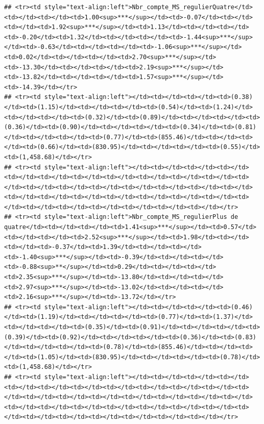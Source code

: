 \documentclass[
]{article}
\begin{document}
\begin{verbatim}
## <tr><td style="text-align:left">Nbr_compte_MS_regulierQuatre</td><td></td><td></td><td>1.00<sup>***</sup></td><td>-0.07</td><td></td><td></td><td>1.92<sup>***</sup></td><td>1.13</td><td></td><td></td><td>-0.20</td><td>1.32</td><td></td><td></td><td>-1.44<sup>***</sup></td><td>-0.63</td><td></td><td></td><td>-1.06<sup>***</sup></td><td>0.02</td><td></td><td></td><td>2.70<sup>***</sup></td><td>-13.30</td><td></td><td></td><td>2.19<sup>***</sup></td><td>-13.82</td><td></td><td></td><td>1.57<sup>***</sup></td><td>-14.39</td></tr>
## <tr><td style="text-align:left"></td><td></td><td></td><td>(0.38)</td><td>(1.15)</td><td></td><td></td><td>(0.54)</td><td>(1.24)</td><td></td><td></td><td>(0.32)</td><td>(0.89)</td><td></td><td></td><td>(0.36)</td><td>(0.90)</td><td></td><td></td><td>(0.34)</td><td>(0.81)</td><td></td><td></td><td>(0.77)</td><td>(855.46)</td><td></td><td></td><td>(0.66)</td><td>(830.95)</td><td></td><td></td><td>(0.55)</td><td>(1,458.68)</td></tr>
## <tr><td style="text-align:left"></td><td></td><td></td><td></td><td></td><td></td><td></td><td></td><td></td><td></td><td></td><td></td><td></td><td></td><td></td><td></td><td></td><td></td><td></td><td></td><td></td><td></td><td></td><td></td><td></td><td></td><td></td><td></td><td></td><td></td><td></td><td></td><td></td></tr>
## <tr><td style="text-align:left">Nbr_compte_MS_regulierPlus de quatre</td><td></td><td></td><td>1.41<sup>***</sup></td><td>0.57</td><td></td><td></td><td>2.52<sup>***</sup></td><td>1.98</td><td></td><td></td><td>-0.37</td><td>1.39</td><td></td><td></td><td>-1.40<sup>***</sup></td><td>-0.39</td><td></td><td></td><td>-0.88<sup>**</sup></td><td>0.29</td><td></td><td></td><td>2.35<sup>***</sup></td><td>-13.80</td><td></td><td></td><td>2.97<sup>***</sup></td><td>-13.02</td><td></td><td></td><td>2.16<sup>***</sup></td><td>-13.72</td></tr>
## <tr><td style="text-align:left"></td><td></td><td></td><td>(0.46)</td><td>(1.19)</td><td></td><td></td><td>(0.77)</td><td>(1.37)</td><td></td><td></td><td>(0.35)</td><td>(0.91)</td><td></td><td></td><td>(0.39)</td><td>(0.92)</td><td></td><td></td><td>(0.36)</td><td>(0.83)</td><td></td><td></td><td>(0.78)</td><td>(855.46)</td><td></td><td></td><td>(1.05)</td><td>(830.95)</td><td></td><td></td><td>(0.78)</td><td>(1,458.68)</td></tr>
## <tr><td style="text-align:left"></td><td></td><td></td><td></td><td></td><td></td><td></td><td></td><td></td><td></td><td></td><td></td><td></td><td></td><td></td><td></td><td></td><td></td><td></td><td></td><td></td><td></td><td></td><td></td><td></td><td></td><td></td><td></td><td></td><td></td><td></td><td></td><td></td></tr>

\end{verbatim}
\end{document}
